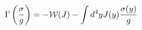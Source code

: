\begin{equation}  \label{25bis}
\Gamma\left(\frac{\sigma}{g}\right)=-\mathcal{W}(J)-\int d^{4}y J(y)\frac{%
\sigma(y)}{g}
\end{equation}

